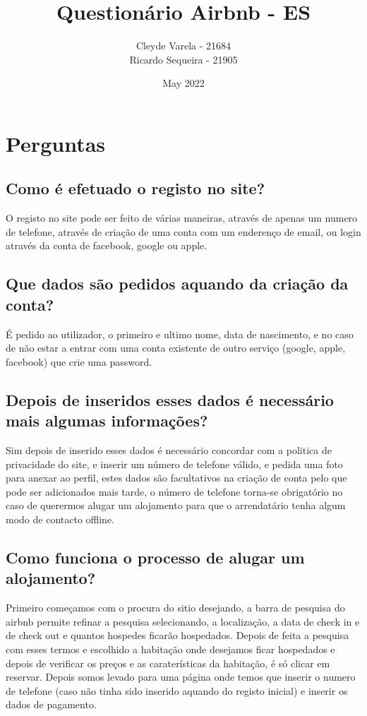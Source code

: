 \documentclass[a4paper]{article}
\title{Questionário Airbnb - ES}
\author{Cleyde Varela - 21684 \\ Ricardo Sequeira - 21905}
\date{May 2022}
\begin{document}
\maketitle

\section{Perguntas}

\subsection{ Como é efetuado o registo no site?}
O registo no site pode ser feito de várias maneiras, através de apenas um numero de telefone, através de criação de uma conta com um enderenço de email, ou login através da conta de facebook, google ou apple.

\subsection{Que dados são pedidos aquando da criação da conta?}
É pedido ao utilizador, o primeiro e ultimo nome, data de nascimento, e no caso de não estar a entrar com uma conta existente de outro serviço (google, apple, facebook) que crie uma password.

\subsection{Depois de inseridos esses dados é necessário mais algumas informações?}
Sim depois de inserido esses dados é necessário concordar com a politica de privacidade do site, e inserir um número de telefone válido, e pedida uma foto para anexar ao perfil, estes dados são facultativos na criação de conta pelo que pode ser adicionados mais tarde, o número de telefone torna-se obrigatório no caso de querermos alugar um alojamento para que o arrendatário tenha algum modo de contacto offline.

\subsection{Como funciona o processo de alugar um alojamento?}
Primeiro começamos com o procura do sitio desejando, a barra de pesquisa do airbnb permite refinar a pesquisa selecionando, a localização, a data de check in e de check out e quantos hospedes ficarão hospedados.
Depois de feita a pesquisa com esses termos e escolhido a habitação onde desejamos ficar hospedados e depois de verificar os preços e as caraterísticas da habitação, é só clicar em reservar.
Depois somos levado para uma página onde temos que inserir o numero de telefone (caso não tinha sido inserido aquando do registo inicial) e inserir os dados de pagamento.
\end{document}
